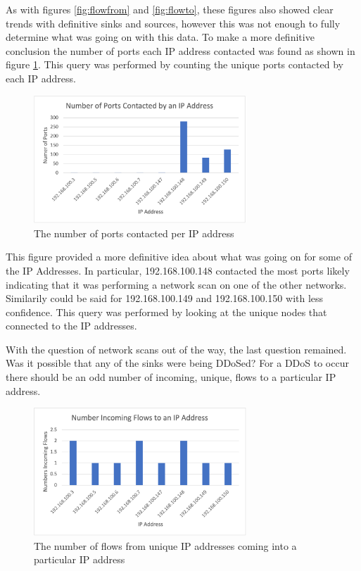 \documentclass[conference]{IEEEtran}
\begin{document}
As with figures \ref{fig:flowfrom} and \ref{fig:flowto}, these figures also showed clear trends with definitive
sinks and sources, however this was not enough to fully determine what was going on with this data. To make a more
definitive conclusion the number of ports each IP address contacted was found as shown in figure 
\ref{fig:portscontacted}. This query was performed by counting the unique ports contacted by each IP address.

\begin{figure}[htbp]
    \includegraphics[width=8cm]{Figure5.png}
    \centering
    \caption{The number of ports contacted per IP address}
    \label{fig:portscontacted}
\end{figure}

This figure provided a more definitive idea about what was going on for some of the IP Addresses. In particular,
192.168.100.148 contacted the most ports likely indicating that it was performing a network scan on one of the
other networks. Similarily could be said for 192.168.100.149 and 192.168.100.150 with less confidence. This query
was performed by looking at the unique nodes that connected to the IP addresses.

With the question of network scans out of the way, the last question remained.
Was it possible that any of the sinks were being DDoSed?
For a DDoS to occur there should be an odd number of incoming, unique, flows to a particular IP address. 

\begin{figure}[htbp]
    \includegraphics[width=8cm]{Figure6.png}
    \centering
    \caption{The number of flows from unique IP addresses coming into a particular IP address}
    \label{fig:incomingflows}
\end{figure}
\end{document}

